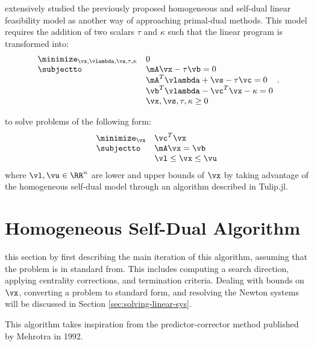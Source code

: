 \documentclass[titlepage]{abhi-tufte-handout}
\begin{document}
 extensively studied the previously
proposed homogeneous and self-dual linear feasibility model as
another way of approaching primal-dual methods.
This model requires the addition of two scalars \(\tau\) and \(\kappa\) such
that the linear program is transformed into:
\begin{equation}\label{eq:self-dual}
\begin{array}{ll}
    \displaystyle\minimize_{\vx, \vlambda, \vs, \tau, \kappa} & 0 \\
    \subjectto & \mA \vx - \tau \vb = 0 \\
               & \mA^T\vlambda + \vs - \tau \vc = 0 \\
               & \vb^T \vlambda - \vc^T \vx - \kappa = 0 \\
               & \vx, \vs, \tau, \kappa \geq 0 \\
\end{array}.
\end{equation}

 to solve problems of the following form:
\begin{equation}\label{eq:problem}
\begin{array}{ll}
    \displaystyle\minimize_{\vx} & \vc^T \vx \\
    \subjectto & \mA \vx = \vb \\
               & \vl \le \vx \le \vu \\
\end{array}
\end{equation}
where \(\vl, \vu \in \RR^n\) are lower and upper bounds of \(\vx\) by taking
advantage of the homogeneous self-dual model through an algorithm described in
Tulip.jl.

\section{Homogeneous Self-Dual Algorithm}\label{sec:algorithm}
 this section by first describing the main iteration
of this algorithm, assuming that the problem is in standard from. This includes
computing a search direction, applying centrality corrections, and termination
criteria. Dealing with bounds on \(\vx\), converting a problem to
standard form, and resolving the Newton systems
will be discussed in Section \ref{sec:solving-linear-sys}.

This algorithm takes inspiration from the predictor-corrector method published
by Mehrotra in 1992.\cite{Mehrotra1992}
\end{document}
